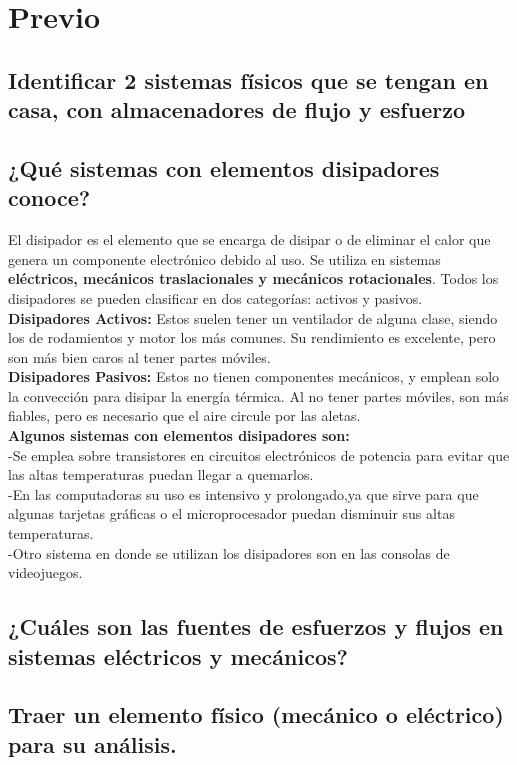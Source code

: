 \noindent \justifying
\section{Previo}


\subsection{Identificar 2 sistemas físicos que se tengan en casa, con almacenadores de flujo y esfuerzo}

\subsection{¿Qué sistemas con elementos disipadores conoce?}
El disipador es el elemento que se encarga de disipar o de eliminar el calor que genera un componente electrónico debido al uso. Se utiliza en sistemas \textbf{eléctricos, mecánicos traslacionales y mecánicos rotacionales}. Todos los disipadores se pueden clasificar en dos categorías: activos y pasivos.\\
\textbf{Disipadores Activos:}
Estos suelen tener un ventilador de alguna clase, siendo los de rodamientos y motor los más comunes. Su rendimiento es excelente, pero son más bien caros al tener partes móviles.\\
\textbf{Disipadores Pasivos:}
Estos no tienen componentes mecánicos, y emplean solo la convección para disipar la energía térmica. Al no tener partes móviles, son más fiables, pero es necesario que el aire circule por las aletas.\\
\textbf{Algunos sistemas con elementos disipadores son:}\\
	-Se emplea sobre transistores en circuitos electrónicos de potencia para evitar que las altas temperaturas puedan llegar a quemarlos.\\
	-En las computadoras su uso es intensivo y prolongado,ya que sirve para que algunas tarjetas gráficas o el microprocesador puedan disminuir sus altas temperaturas.\\
	-Otro sistema en donde se utilizan los disipadores son en las consolas de videojuegos.
	
\subsection{¿Cuáles son las fuentes de esfuerzos y flujos en sistemas eléctricos y mecánicos?}
\subsection{Traer un elemento físico (mecánico o eléctrico) para su análisis.}


